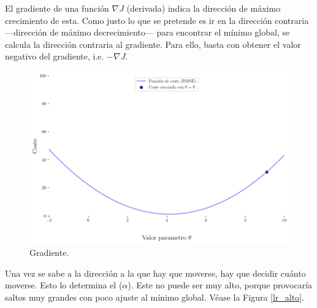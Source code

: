 El gradiente de una función $\nabla J$ (derivada) indica la dirección de máximo crecimiento de esta. Como justo lo que se pretende es ir en la dirección contraria ---dirección de máximo decrecimiento--- para encontrar el mínimo global, se calcula la dirección contraria al gradiente. Para ello, basta con obtener el valor negativo del gradiente, i.e. $-\nabla J$.


\begin{figure}[H]
    \centering
    \includegraphics[scale = 0.35]{imgs/valor9.png}
    \caption{Gradiente.}
    \label{grad}
\end{figure}

Una vez se sabe a la dirección a la que hay que moverse, hay que decidir cuánto moverse. Esto lo determina el  ($\alpha$). Este  no puede ser muy alto, porque provocaría saltos muy grandes con poco ajuste al mínimo global. Véase la Figura \ref{lr_alto}.

